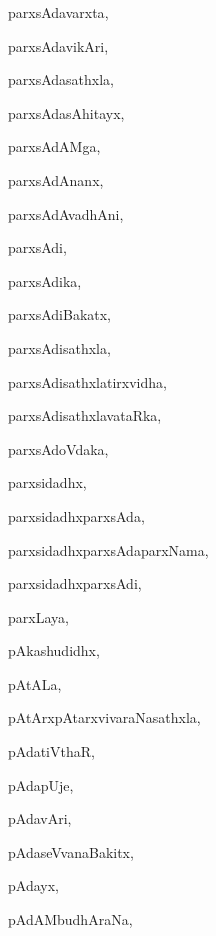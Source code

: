 \begin{multicols}{3}
{\noindent
{parxsAdavarxta}, \pageref{parxsAdavarxta}

\noindent
{parxsAdavikAri}, \pageref{parxsAdavikAri2}

\noindent
{parxsAdasathxla}, \pageref{parxsAdasathxla}

\noindent
{parxsAdasAhitayx}, \pageref{parxsAdasAhitayx}

\noindent
{parxsAdAMga}, \pageref{parxsAdAMga}

\noindent
{parxsAdAnanx}, \pageref{parxsAdAnanx}

\noindent
{parxsAdAvadhAni}, \pageref{parxsAdAvadhAni}

\noindent
{parxsAdi}, \pageref{parxsAdi}

\noindent
{parxsAdika}, \pageref{parxsAdika}

\noindent
{parxsAdiBakatx}, \pageref{parxsAdiBakatx}

\noindent
{parxsAdisathxla}, \pageref{parxsAdisathxla}

\noindent
{parxsAdisathxlatirxvidha}, \pageref{parxsAdisathxlatirxvidha}

\noindent
{parxsAdisathxlavataRka}, \pageref{parxsAdisathxlavataRka}

\noindent
{parxsAdoVdaka}, \pageref{parxsAdoVdaka}

\noindent
{parxsidadhx}, \pageref{parxsidadhx}

\noindent
{parxsidadhxparxsAda}, \pageref{parxsidadhxparxsAda}

\noindent
{parxsidadhxparxsAdaparxNama}, \pageref{parxsidadhxparxsAdaparxNama}

\noindent
{parxsidadhxparxsAdi}, \pageref{parxsidadhxparxsAdi}

\noindent
{parxLaya}, \pageref{parxLaya}

\noindent
{pAkashudidhx}, \pageref{pAkashudidhx}

\noindent
{pAtALa}, \pageref{pAtALa}

\noindent
{pAtArxpAtarxvivaraNasathxla}, \pageref{pAtArxpAtarxvivaraNasathxla}

\noindent
{pAdatiVthaR}, \pageref{pAdatiVthaR}

\noindent
{pAdapUje}, \pageref{pAdapUje}

\noindent
{pAdavAri}, \pageref{pAdavAri}

\noindent
{pAdaseVvanaBakitx}, \pageref{pAdaseVvanaBakitx}

\noindent
{pAdayx}, \pageref{pAdayx}

\noindent
{pAdAMbudhAraNa}, \pageref{pAdAMbudhAraNa}

}
\end{multicols}
